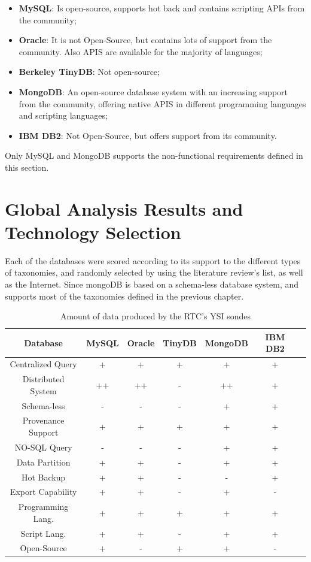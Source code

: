 \begin{itemize}
  \item \textbf{MySQL}: Is open-source, supports hot back and contains
  scripting APIs from the community;
  \item \textbf{Oracle}: It is not Open-Source, but contains lots of support
  from the community. Also APIS are available for the majority of languages;
  \item \textbf{Berkeley TinyDB}: Not open-source;
  \item \textbf{MongoDB}: An open-source database system with an increasing
  support from the community, offering native APIS in different programming
  languages and scripting languages;
  \item \textbf{IBM DB2}: Not Open-Source, but offers support from its
  community.
\end{itemize}

Only MySQL and MongoDB supports the non-functional requirements defined in this
section.

\section{Global Analysis Results and Technology Selection}

Each of the databases were scored according to its support to the different
types of taxonomies, and randomly selected by using the literature review's
list, as well as the Internet. Since mongoDB is based on a schema-less database
system, and supports most of the taxonomies defined in the previous chapter.

\begin{table}
    \label{tab:ysi-data-distribution}
    \caption{Amount of data produced by the RTC's YSI sondes}
        \begin{center}
        \begin{tabular}{|c|c|c|c|c|c|c|}\hline 
        \textbf{Database} & \textbf{MySQL} & \textbf{Oracle} &
        \textbf{TinyDB} & \textbf{MongoDB} & \textbf{IBM DB2}\\\hline 
        Centralized Query & + & + & + & + & + \\\hline 
        Distributed System & ++ & ++ & - & ++ & +\\\hline 
        Schema-less & - & - & - & + & +\\\hline 
        Provenance Support & + & + & + & + & +\\\hline 
        NO-SQL Query & - & - & - & + & +\\\hline 
        Data Partition & + & + & - & + & +\\\hline 
        Hot Backup & + & + & - & - & +\\\hline 
        Export Capability & + & + & - & + & -\\\hline 
        Programming Lang. & + & + & + & + & +\\\hline
        Script Lang. & + & + & - & + & +\\\hline
        Open-Source & + & - & + & + & -\\\hline
        \end{tabular}
        \end{center}
\end{table}
